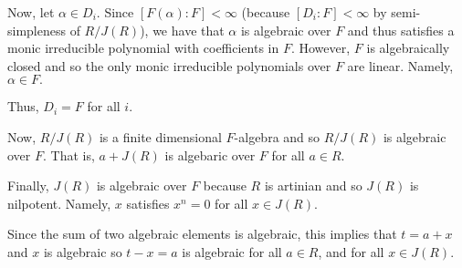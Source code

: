 \documentclass[12pt]{AlgebraQual}
\begin{document}
\begin{solution}
Now, let $\alpha\in D_i$. Since $[F(\alpha):F]<\infty$ (because $[D_i:F]<\infty$ by semi-simpleness of $R/J(R)$), we have that $\alpha$ is algebraic over $F$ and thus satisfies a monic irreducible polynomial with coefficients in $F$. However, $F$ is algebraically closed and so the only monic irreducible polynomials over $F$ are linear. Namely, $\alpha\in F.$

Thus, $D_i=F$ for all $i$.

Now, $R/J(R)$ is a finite dimensional $F$-algebra and so $R/J(R)$ is algebraic over $F$. That is, $a+J(R)$ is algebaric over $F$ for all $a\in R.$

Finally, $J(R)$ is algebraic over $F$ because $R$ is artinian and so $J(R)$ is nilpotent. Namely, $x$ satisfies $x^n=0$ for all $x\in J(R)$.

Since the sum of two algebraic elements is algebraic, this implies that $t=a+x$ and $x$ is algebraic so $t-x=a$ is algebraic for all $a\in R$, and for all $x\in J(R).$
\end{solution}
\newpage
\end{document}

